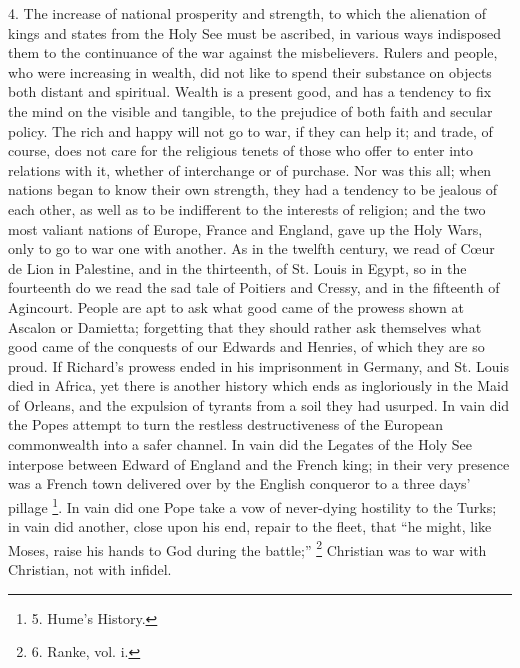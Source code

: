 4. The increase of national
prosperity and strength, to which the alienation of kings and states
from the Holy See must be ascribed, in various ways indisposed them to
the continuance of the war against the misbelievers. Rulers and
people, who were increasing in wealth, did not like to spend their
substance on objects both distant and spiritual. Wealth is a present
good, and has a tendency to fix the mind on the visible and tangible,
to the prejudice of both faith and secular policy. The rich and happy
will not go to war, if they can help it; and trade, of course, does
not care for the religious tenets of those who offer to enter into
relations with it, whether of interchange or of purchase. Nor was this
all; when nations began to know their own strength, they had a
tendency to be jealous of each other, as well as to be indifferent to
the interests of religion; and the two most valiant nations of Europe,
France and England, gave up the Holy Wars, only to go to war one with
another. As in the twelfth century, we read of Cœur de Lion in
Palestine, and in the thirteenth, of St. Louis in Egypt, so in the
fourteenth do we read the sad tale of Poitiers and Cressy, and in the
fifteenth of Agincourt. People are apt to ask what good came of the
prowess shown at Ascalon or Damietta; forgetting that they should
rather ask themselves what good came of the conquests of our Edwards
and Henries, of which they are so proud. If Richard's prowess ended in
his imprisonment in Germany, and St. Louis died in Africa, yet there
is another history which ends as ingloriously in the Maid of
Orleans, and the expulsion of tyrants from a soil they had usurped. In
vain did the Popes attempt to turn the restless destructiveness of the
European commonwealth into a safer channel. In vain did the Legates of
the Holy See interpose between Edward of England and the French king;
in their very presence was a French town delivered over by the English
conqueror to a three days' pillage \footnote{5.
Hume's History.}. In vain did one Pope take a vow of never-dying hostility to
the Turks; in vain did another, close upon his end, repair to the
fleet, that ``he might, like Moses, raise his hands to God during the
battle;'' \footnote{6.
Ranke, vol. i.} Christian was to
war with Christian, not with infidel.

